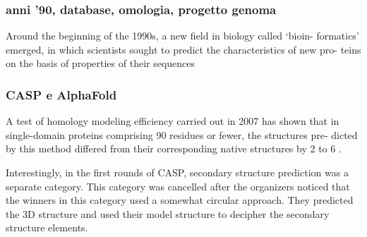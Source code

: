 \subsubsection{anni '90, database, omologia, progetto genoma}

Around the beginning of the 1990s, a new field in biology called ‘bioin-
formatics’ emerged, in which scientists sought to predict the characteristics of new pro-
teins on the basis of properties of their sequences

\subsubsection{CASP e AlphaFold}

A test of homology modeling efficiency carried out in 2007 has
shown that in single-domain proteins comprising 90 residues or fewer, the structures pre-
dicted by this method differed from their corresponding native structures by 2 to 6 \supercite{dill2008protein}.



Interestingly, in the first rounds of CASP, secondary structure prediction was a separate category. This
category was cancelled after the organizers noticed that the winners in this category used a somewhat circular
approach. They predicted the 3D structure and used their model structure to decipher the secondary structure
elements.

\clearpage